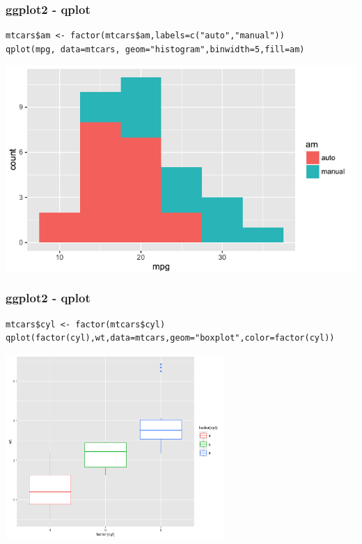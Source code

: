 \documentclass{beamer}
\begin{document}

\begin{frame}[fragile]
\frametitle{ggplot2 - qplot}
\scriptsize
\begin{verbatim}
mtcars$am <- factor(mtcars$am,labels=c("auto","manual"))
qplot(mpg, data=mtcars, geom="histogram",binwidth=5,fill=am) 
\end{verbatim}
\begin{center}
\includegraphics{../IMG/qplot3.png}
\end{center}
\end{frame}




\begin{frame}[fragile]
\frametitle{ggplot2 - qplot}
\scriptsize
\begin{verbatim}
mtcars$cyl <- factor(mtcars$cyl)
qplot(factor(cyl),wt,data=mtcars,geom="boxplot",color=factor(cyl))
\end{verbatim}
\begin{center}
\includegraphics[height=7cm]{../IMG/ggplot_box.png}
\end{center}
\end{frame}
\end{document}
